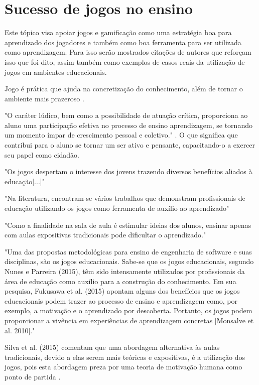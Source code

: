 
\section[Sucesso de jogos no ensino]{Sucesso de jogos no ensino}

Este tópico visa apoiar jogos e gamificação como uma estratégia boa para aprendizado dos jogadores e também como boa ferramenta para ser utilizada como aprendizagem. Para isso serão mostrados citações de autores que reforçam isso que foi dito, assim também como exemplos de casos reais da utilização de jogos em ambientes educacionais. 

Jogo é prática que ajuda na concretização do conhecimento, além de tornar o ambiente mais prazeroso \cite{jogoPratPedagoc}. 

"O caráter lúdico, bem como a possibilidade de atuação crítica, proporciona ao aluno uma participação efetiva no processo de ensino aprendizagem, se tornando um momento ímpar de crescimento pessoal e coletivo."  \cite{jogoPratPedagoc}. O que significa que contribui para o aluno se tornar um ser ativo e pensante, capacitando-o a exercer seu papel como cidadão.

"Os jogos despertam o interesse dos jovens trazendo diversos benefícios aliados à educação[...]" \cite{appcalculo}

"Na literatura, encontram-se vários trabalhos que demonstram profissionais de educação utilizando os jogos como ferramenta de auxílio ao aprendizado" \cite[p. 3]{sucessoJogoEngSoft}

"Como a finalidade na sala de aula é estimular ideias dos alunos, ensinar apenas com aulas expositivas
tradicionais pode dificultar o aprendizado." \cite[p. 4]{sucessoJogoEngSoft} 

"Uma das propostas metodológicas para ensino de engenharia de software e suas disciplinas, são os jogos educacionais. Sabe-se que os jogos educacionais, segundo Nunes e Parreira (2015), têm sido intensamente utilizados por profissionais da área de educação como auxílio para a construção do conhecimento. Em sua pesquisa, Fukusawa et al. (2015) apontam alguns dos benefícios que os jogos educacionais podem trazer ao
processo de ensino e aprendizagem como, por exemplo, a motivação e o aprendizado por descoberta. Portanto, os jogos podem proporcionar a vivência em experiências de aprendizagem concretas [Monsalve et al. 2010]." \cite[4]{sucessoJogoEngSoft}

Silva et al. (2015) comentam que uma abordagem alternativa às aulas tradicionais, devido  a elas serem mais teóricas e expositivas, é a utilização dos jogos, pois esta abordagem preza por uma teoria de motivação humana como ponto de partida \cite{sucessoJogoEngSoft}.

